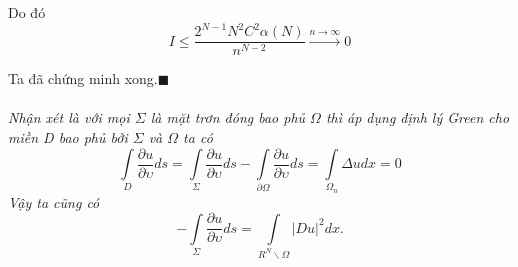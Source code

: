Do đó
\[
I \le \frac{{2^{N - 1} N^2 C^2 \alpha (N)}}{{n^{N - 2} }}\mathop  \to \limits^{n \to \infty } 0
\]

Ta đã chứng minh xong.$\blacksquare$
\\
\\
\textit{Nhận xét là với mọi $ \Sigma $ là mặt trơn đóng bao phủ $ \Omega$ thì áp dụng định lý Green cho miền D bao phủ bởi $ \Sigma$ và $\Omega$ ta có 
\[
\int\limits_D {\frac{{\partial u}}{{\partial \upsilon }}ds}  = \int\limits_\Sigma  {\frac{{\partial u}}{{\partial \upsilon }}ds}  - \int\limits_{\partial \Omega } {\frac{{\partial u}}{{\partial \upsilon }}ds}  = \int\limits_{\Omega _n } {\Delta udx}  = 0
\] 
Vậy ta cũng có 
\[
 - \int\limits_\Sigma  {\frac{{\partial u}}{{\partial \upsilon }}ds}  = \int\limits_{R^N \backslash \Omega } {\left| {Du} \right|^2 dx} .\] }
